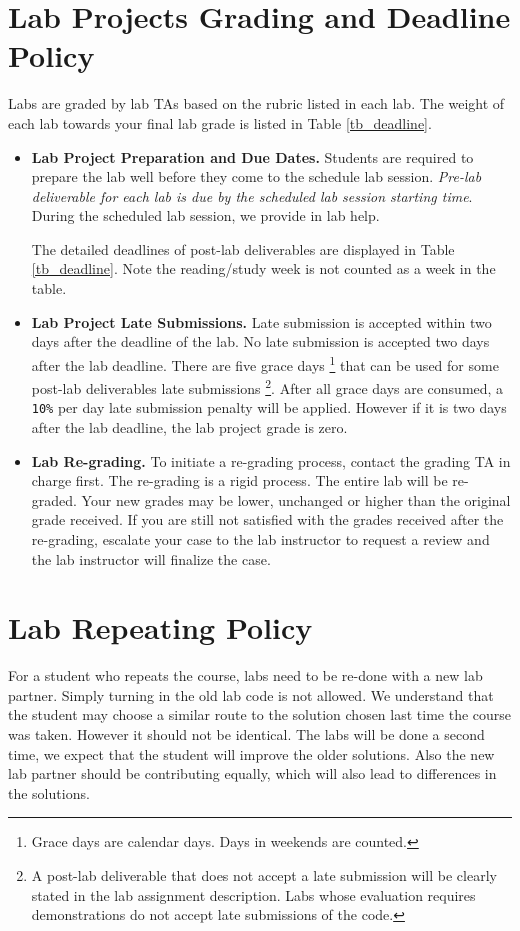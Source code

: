 \section*{Lab Projects Grading and Deadline Policy} 
Labs are graded by lab TAs based on the rubric listed in each lab. The weight of each lab towards your final lab grade is listed in Table \ref{tb_deadline}. 

    \begin{itemize}
    \item {\bf Lab Project Preparation and Due Dates.}
        Students are required to prepare the lab well 
        before they come to the schedule lab session. 
        {\em Pre-lab deliverable for each lab is due by the scheduled lab session starting time}.
        During the scheduled lab session, we provide in lab help. 
        
        The detailed deadlines of post-lab deliverables 
        are displayed in Table \ref{tb_deadline}. Note the reading/study week is not counted as a week in the table. 
    \item {\bf Lab Project Late Submissions.} 
    	Late submission is accepted within two days after the deadline of the lab. 
    	No late submission is accepted two days after the lab deadline.
    	There are five grace days \footnote{Grace days are calendar days. Days in weekends are counted.}
        that can be used for some post-lab deliverables late submissions
        \footnote{A post-lab deliverable that does not accept a late submission 
        will be clearly stated in the lab assignment description. 
        Labs whose evaluation requires demonstrations do not accept late submissions
        of the code.}. 
        After all grace days are consumed, a \verb+10%+ per day late submission penalty will be applied.
        However if it is two days after the lab deadline, the lab project grade is zero. 
    \item {\bf Lab Re-grading.}
    	To initiate a re-grading process, contact the grading TA in charge first. The re-grading is a rigid process. The entire lab will be re-graded. Your new grades may be lower, unchanged or higher than the original grade received. If you are still not satisfied with the grades received after the re-grading, escalate your case to the lab instructor to request a review and the lab instructor will finalize the case.
    \end{itemize}
\section*{Lab Repeating Policy}
For a student who repeats the course, labs need to be re-done with a new lab partner. 
Simply turning in the old lab code is not allowed. 
We understand that the student may choose a similar route to the solution chosen last time 
the course was taken. However it should not be identical. The labs will be done a second time,
we expect that the student will improve the older solutions. Also the new lab partner should be 
contributing equally, which will also lead to differences in the solutions. 

